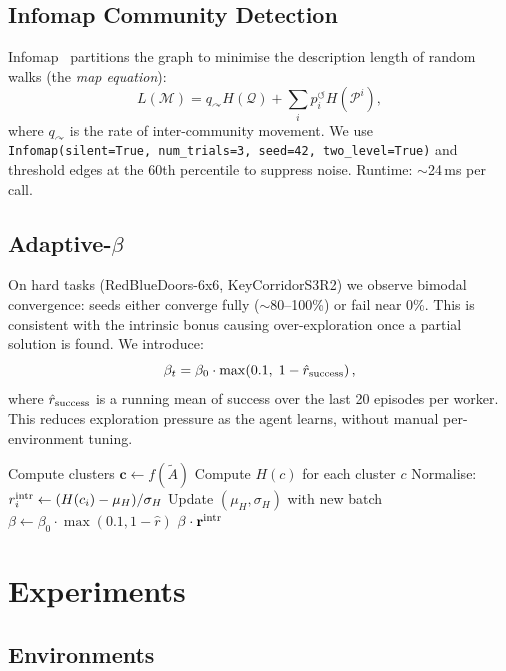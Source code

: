 \documentclass[10pt,twocolumn]{article}
\newcommand{\fastsi}{FastSI2E}
\begin{document}
\subsection{Infomap Community Detection}

Infomap~\citep{infomap2008} partitions the graph to minimise the description
length of random walks (the \emph{map equation}):
\[
  L(\mathcal{M}) = q_\curvearrowright H(\mathcal{Q})
    + \sum_i p_i^\circlearrowleft H(\mathcal{P}^i),
\]
where $q_\curvearrowright$ is the rate of inter-community movement.
We use \texttt{Infomap(silent=True, num\_trials=3, seed=42, two\_level=True)}
and threshold edges at the 60th percentile to suppress noise. Runtime:
$\sim$24\,ms per call.

\subsection{Adaptive-$\beta$}
\label{sec:adaptive_beta}

On hard tasks (RedBlueDoors-6x6, KeyCorridorS3R2) we observe bimodal
convergence: seeds either converge fully ($\sim$80--100\%) or fail near 0\%.
This is consistent with the intrinsic bonus causing over-exploration once a
partial solution is found. We introduce:
\[
  \beta_t = \beta_0 \cdot \max\!\left(0.1,\; 1 - \hat{r}_{\rm success}\right),
\]
where $\hat{r}_{\rm success}$ is a running mean of success over the last 20
episodes per worker. This reduces exploration pressure as the agent learns,
without manual per-environment tuning.

\begin{algorithm}[t]
\SetAlgoLined
{}
Compute clusters $\mathbf{c} \leftarrow f(\tilde{A})$\;
Compute $H(c)$ for each cluster $c$\;
Normalise: $r^{\rm intr}_i \leftarrow (H(c_i) - \mu_H)/\sigma_H$\;
Update $(\mu_H, \sigma_H)$ with new batch\;
$\beta \leftarrow \beta_0 \cdot \max(0.1, 1 - \hat{r})$\;
\Return $\beta \cdot \mathbf{r}^{\rm intr}$
\caption{\fastsi{} intrinsic bonus computation}
\end{algorithm}

\section{Experiments}

\subsection{Environments}
\end{document}
